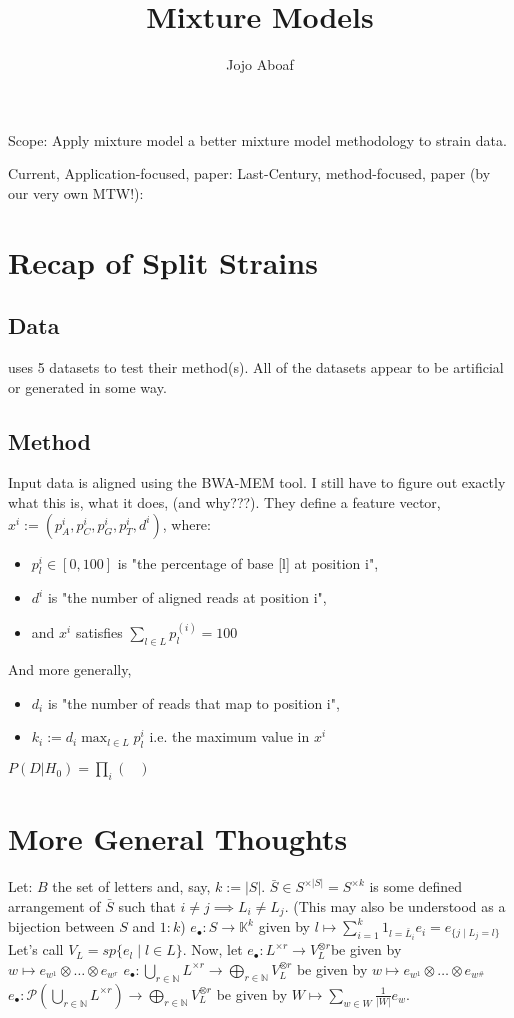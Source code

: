 \documentclass[letterpaper,10pt]{article}
\title{Mixture Models}
\author{Jojo Aboaf}
\begin{document}
Scope: Apply mixture model a better mixture model methodology to strain data.

Current, Application-focused, paper: \cite{SplitStrains}
Last-Century, method-focused, paper (by our very own MTW!): \cite{CasRobWel2004}

\section{Recap of Split Strains}

\subsection{Data}
\cite{SplitStrains} uses 5 datasets to test their method(s). All of the datasets appear to be artificial or generated in some way.
\subsection{Method}
Input data is aligned using the BWA-MEM tool. I still have to figure out exactly what this is, what it does, (and why???).
They define a feature vector, $x^i := (p_A^i,p_C^i,p_G^i,p_T^i,d^i)$, where:
\begin{itemize}
    \item $p_l^i \in [0,100]$ is "the percentage of base [l] at position i",
    \item $d^i$ is "the number of aligned reads at position i",
    \item and $x^i$ satisfies $\sum_{l\in L} p_l^{(i)} = 100$
\end{itemize}
And more generally,
\begin{itemize}
    \item $d_i$ is "the number of reads that map to position i",
    \item $k_i := d_i \max_{l\in L} p_l^i$ i.e. the maximum value in $x^i$
\end{itemize}

$P(D|H_0) = \prod_i \begin{pmatrix} \end{pmatrix} $
\section{More General Thoughts}
Let:
$B$ the set of letters and, say, $k:= |S|$.
$\bar{S}\in S^{\times|S|} = S^{\times k}$ is some defined arrangement of $\bar{S}$ such that $ i\neq j \implies L_i \neq L_j$. (This may also be understood as a bijection between $S$ and $1:k$)
$e_{\bullet}:S\rightarrow \mathbb{K}^k$ given by $l \mapsto\sum_{i=1}^k 1_{l=\bar{L}_i}e_i = e_{\{j \mid L_j =l\}}$
Let's call $V_L = sp\{e_l \mid l\in L\}$.
Now, let
$e_{\bullet}:L^{\times r} \rightarrow V_L^{\otimes r}$be given by $w \mapsto e_{w^1}\otimes\dots\otimes e_{w^r}$
$e_{\bullet}:\bigcup_{r\in\mathbb{N}}L^{\times r} \rightarrow \bigoplus_{r\in\mathbb{N}} V_L^{\otimes r} $ be given by $w\mapsto e_{w^1}\otimes\dots\otimes e_{w^\#}$
$e_{\bullet}:\mathscr{P}(\bigcup_{r\in \mathbb{N}} L^{\times r })\rightarrow \bigoplus_{r\in\mathbb{N}} V_L^{\otimes r}$ be given by $W \mapsto\sum_{w\in W} \frac{1}{|W|}e_w$.
\end{document}
